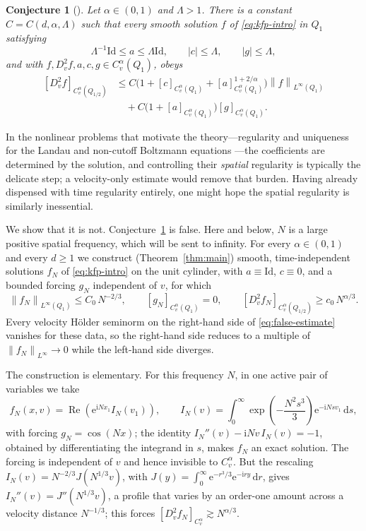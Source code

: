 \documentclass[10pt,a4paper]{amsart}
\numberwithin{equation}{section}
\newtheorem{conjecture}[theorem]{Conjecture}
\newcommand{\Id}{\mathrm{Id}}
\newcommand{\ii}{\mathrm{i}}
\newcommand{\e}{\mathrm{e}}
\newcommand{\dd}{\,\mathrm{d}}
\newcommand{\norm}[1]{\left\|#1\right\|}
\begin{document}
\begin{conjecture}[{\cite[Conjecture~1.3]{HW}}]\label{conj:false}
Let $\alpha\in(0,1)$ and $\Lambda>1$.  There is a constant
$C=C(d,\alpha,\Lambda)$ such that every smooth solution $f$ of
\eqref{eq:kfp-intro} in $Q_1$ satisfying
\[
   \Lambda^{-1}\Id\le a\le\Lambda\Id,
   \qquad |c|\le\Lambda,
   \qquad |g|\le\Lambda,
\]
and with \(f,D_v^2f,a,c,g\in C_v^\alpha(Q_1)\), obeys
\begin{equation}\label{eq:false-estimate}
\begin{aligned}
   [D_v^2f]_{C_v^\alpha(Q_{1/2})}
   &\le C\Big(1+[c]_{C_v^\alpha(Q_1)}+[a]_{C_v^\alpha(Q_1)}^{1+2/\alpha}\Big)
        \norm{f}_{L^\infty(Q_1)} \\
   &\quad +C\Big(1+[a]_{C_v^\alpha(Q_1)}\Big)[g]_{C_v^\alpha(Q_1)}.
\end{aligned}
\end{equation}
\end{conjecture}
In the nonlinear problems that motivate the theory---regularity and uniqueness for the Landau and non-cutoff Boltzmann equations \cite{ImbertSilvestreBoltzmann,Silvestre17,Fournier}---the coefficients are determined by the solution, and controlling their \emph{spatial} regularity is typically the delicate step; a velocity-only estimate would remove that burden.  Having already dispensed with time regularity entirely, one might hope the spatial regularity is similarly inessential.

We show that it is not.  Conjecture~\ref{conj:false} is false.  Here and below, $N$ is a large positive spatial frequency, which will be sent to infinity.  For every $\alpha\in(0,1)$ and every $d\ge1$ we construct (Theorem~\ref{thm:main}) smooth, time-independent solutions $f_N$ of \eqref{eq:kfp-intro} on the unit cylinder, with $a\equiv\Id$, $c\equiv0$, and a bounded forcing $g_N$ independent of $v$, for which
\[
   \norm{f_N}_{L^\infty(Q_1)}\le C_0\,N^{-2/3},
   \qquad [g_N]_{C_v^\alpha(Q_1)}=0,
   \qquad [D_v^2 f_N]_{C_v^\alpha(Q_{1/2})}\ge c_0\,N^{\alpha/3}.
\]
Every velocity H\"older seminorm on the right-hand side of \eqref{eq:false-estimate} vanishes for these data, so the right-hand side reduces to a multiple of $\norm{f_N}_{L^\infty}\to0$ while the left-hand side diverges.

The construction is elementary.  For this frequency $N$, in one active pair of variables we take
\[
   f_N(x,v)=\operatorname{Re}\!\left(\e^{\ii Nx_1}I_N(v_1)\right),
   \qquad
   I_N(v)=\int_0^\infty\exp\!\left(-\frac{N^2 s^3}{3}\right)\e^{-\ii N s v_1}\dd s,
\]
with forcing $g_N=\cos(Nx)$; the identity $I_N''(v)-\ii N v\,I_N(v)=-1$, obtained by differentiating the integrand in $s$, makes $f_N$ an exact solution.  The forcing is independent of $v$ and hence invisible to $C_v^\alpha$.  But the rescaling $I_N(v)=N^{-2/3}J(N^{1/3}v)$, with $J(y)=\int_0^\infty\e^{-r^3/3}\e^{-\ii ry}\dd r$, gives $I_N''(v)=J''(N^{1/3}v)$, a profile that varies by an order-one amount across a velocity distance $N^{-1/3}$; this forces $[D_v^2 f_N]_{C_v^\alpha}\gtrsim N^{\alpha/3}$.
\end{document}
